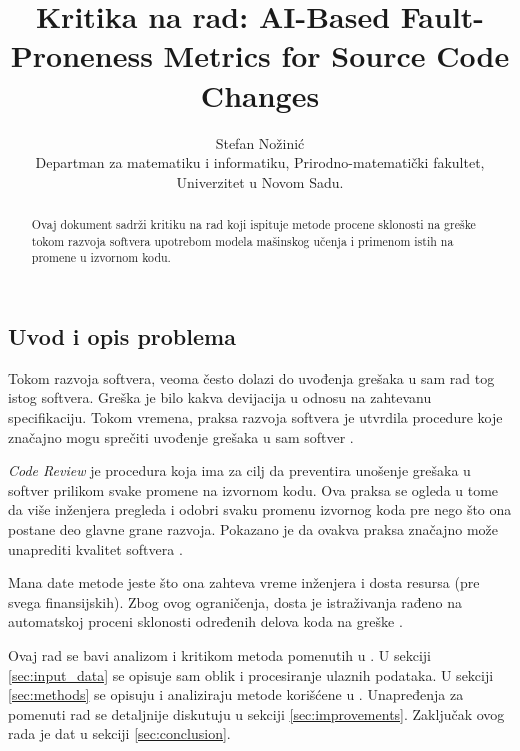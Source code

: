 \documentclass[twocolumns]{article}
\begin{document}
\title{Kritika na rad: AI-Based Fault-Proneness Metrics for Source Code Changes}
\author{Stefan Nožinić \\
Departman za matematiku i informatiku, Prirodno-matematički fakultet, Univerzitet u Novom Sadu. \\
}

\maketitle
\begin{abstract}
    Ovaj dokument sadrži kritiku na rad koji ispituje metode procene sklonosti na greške tokom razvoja softvera upotrebom modela mašinskog učenja i primenom istih na promene u izvornom kodu. 
\end{abstract}


\begin{multicols}{2}

  \section{Uvod i opis problema}
  \label{sec:introduction}
  
  Tokom razvoja softvera, veoma često dolazi do uvođenja grešaka u sam rad tog istog softvera. Greška je bilo kakva devijacija u odnosu na zahtevanu specifikaciju. Tokom vremena, praksa razvoja softvera je utvrdila procedure koje značajno mogu sprečiti uvođenje grešaka u sam softver \cite{kozlov2013fault}. 
  
  \textit{Code Review} je procedura koja ima za cilj da preventira unošenje grešaka u softver prilikom svake promene na izvornom kodu. Ova praksa se ogleda u tome da više inženjera pregleda i odobri svaku promenu izvornog koda pre nego što ona postane deo glavne grane razvoja. Pokazano je da ovakva praksa značajno može unaprediti kvalitet softvera \cite{kozlov2013fault}.
  
  Mana date metode jeste što ona zahteva vreme inženjera i dosta resursa (pre svega finansijskih). Zbog ovog ograničenja, dosta je istraživanja rađeno na automatskoj proceni sklonosti određenih delova koda na greške \cite{altiero2023ai,fenton1999critique,gondra2008applying,ouellet2023combining}. 
  
  Ovaj rad se bavi analizom i kritikom metoda pomenutih u \cite{altiero2023ai}. U sekciji \ref{sec:input_data} se opisuje sam oblik i procesiranje ulaznih podataka. U sekciji \ref{sec:methods} se opisuju i analiziraju metode korišćene u \cite{altiero2023ai}. Unapređenja za pomenuti rad se detaljnije diskutuju u sekciji \ref{sec:improvements}. Zaključak ovog rada je dat u sekciji \ref{sec:conclusion}.
  

\end{multicols}
\end{document}
